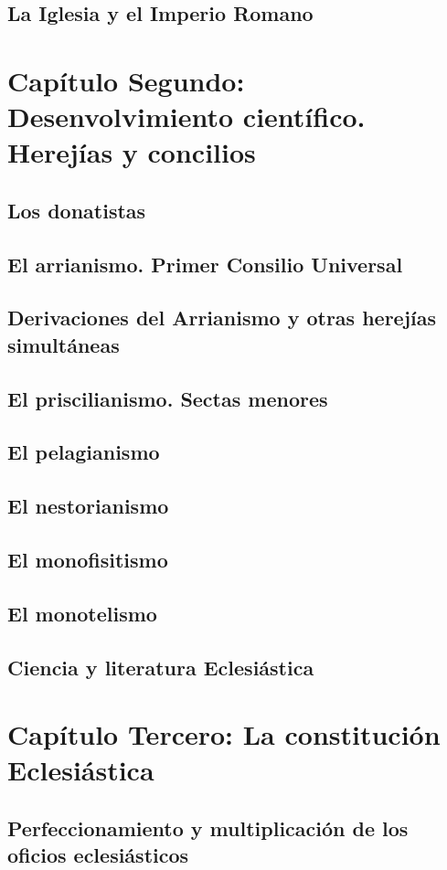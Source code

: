 \raggedbottom{} \documentclass[12pt, a4paper]{book}
\begin{document}
\section{La Iglesia y el Imperio Romano}
\chapter{Capítulo Segundo: Desenvolvimiento científico. Herejías y concilios}
\section{Los donatistas}
\section{El arrianismo. Primer Consilio Universal}
\section{Derivaciones del Arrianismo y otras herejías simultáneas}
\section{El priscilianismo. Sectas menores}
\section{El pelagianismo}
\section{El nestorianismo}
\section{El monofisitismo}
\section{El monotelismo}
\section{Ciencia y literatura Eclesiástica}
\chapter{Capítulo Tercero: La constitución Eclesiástica}
\section{Perfeccionamiento y multiplicación de los oficios eclesiásticos}
\end{document}
